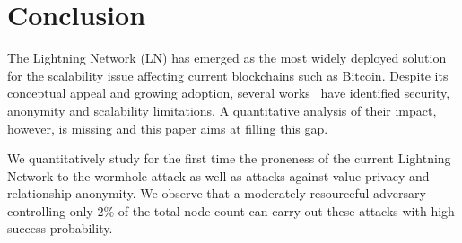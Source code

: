 \section{Conclusion}
\label{sec:conclusions}

The Lightning Network (LN) has emerged as the most widely deployed solution for the scalability issue affecting current blockchains such as Bitcoin. 
Despite its conceptual appeal and growing adoption,  several works~\cite{Malavolta2017, Malavolta2019} have identified 
 security, anonymity and scalability limitations. A quantitative 
analysis of their impact, however, is missing and this paper aims at filling this gap.

We quantitatively study for the first time the proneness of the current Lightning Network to the 
wormhole attack as well as attacks against value privacy and relationship anonymity. 
We observe that a moderately resourceful adversary controlling only $2\%$ of the total node count can carry out these attacks with high success probability.



